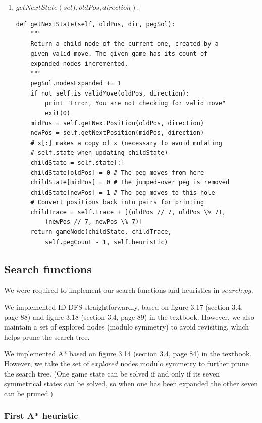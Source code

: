 \documentclass[11pt]{article}
\begin{document}
\begin{enumerate}
\item \(getNextState(self, oldPos, direction)\):

\lstset{language=Python}
\begin{lstlisting}[frame=single]
def getNextState(self, oldPos, dir, pegSol):
	"""
	Return a child node of the current one, created by a
	given valid move. The given game has its count of
	expanded nodes incremented.
	"""
	pegSol.nodesExpanded += 1
	if not self.is_validMove(oldPos, direction):
		print "Error, You are not checking for valid move"
		exit(0)
	midPos = self.getNextPosition(oldPos, direction)
	newPos = self.getNextPosition(midPos, direction)
	# x[:] makes a copy of x (necessary to avoid mutating
	# self.state when updating childState)
	childState = self.state[:]
	childState[oldPos] = 0 # The peg moves from here
	childState[midPos] = 0 # The jumped-over peg is removed
	childState[newPos] = 1 # The peg moves to this hole
	# Convert positions back into pairs for printing
	childTrace = self.trace + [(oldPos // 7, oldPos \% 7),
		(newPos // 7, newPos \% 7)]
	return gameNode(childState, childTrace,
		self.pegCount - 1, self.heuristic)
\end{lstlisting}

\end{enumerate}

\subsection{Search functions}

We were required to implement our search functions and heuristics in
\(search.py\).

We implemented ID-DFS straightforwardly, based on figure 3.17 (section 3.4,
page 88) and figure 3.18 (section 3.4, page 89) in the textbook. However, we
also maintain a set of explored nodes (modulo symmetry) to avoid revisiting,
which helps prune the search tree.

We implemented A* based on figure 3.14 (section 3.4, page 84) in the textbook.
However, we take the set of \(explored\) nodes modulo symmetry to further prune
the search tree. (One game state can be solved if and only if its seven
symmetrical states can be solved, so when one has been expanded the other
seven can be pruned.)

\subsubsection{First A* heuristic}
\end{document}
